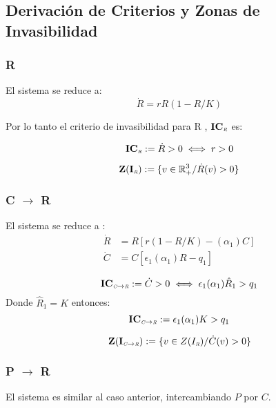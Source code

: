 


\subsection{Derivaci\'on de Criterios y Zonas de Invasibilidad}\label{subsec:CI}

\subsubsection{R}
El sistema se reduce a:
\begin{equation}
\dot{R}= rR(1-R/K)
\end{equation}

Por lo tanto el criterio de invasibilidad para R , $\mathbf{IC_{\textit{\tiny R}}}$ es:

\begin{equation}\label{eq:ICR}
\mathbf{IC_{\textit{\tiny R}}} := \dot{R} > 0 \iff r > 0
\end{equation}

\begin{equation}
\mathbf{Z(I_{\textit{\tiny R}})} := \{ v \in \mathbb{R}^3_+ / \dot{R}(v)>0 \}
\end{equation}

\subsubsection{C $\to$ R}
El sistema se reduce a :
\begin{equation}
\begin{aligned}
\dot{R} &= R\left[r(1-R/K)- (\alpha_{1}) C \right] \\
\dot{C} &= C \left[\epsilon_1 (\alpha_{1}) R  -q_1 \right]
\end{aligned}
\end{equation}


\begin{equation} \mathbf{IC_{\textit{\tiny C} \to \textit{\tiny R}}} := \dot{C} >0 \iff \epsilon_1(\alpha_1)\hat{R}_1 > q_1  \end{equation}
Donde $\hat{R}_1 = K$ entonces:
\begin{equation} \mathbf{IC_{\textit{\tiny C} \to \textit{\tiny R}}} := \epsilon_1(\alpha_1) K > q_1 \end{equation}
            
\begin{equation}
\mathbf{Z(I_{\textit{\tiny C} \to \textit{\tiny R}})} := \{v \in Z(I_{\textit{\tiny R}}) / \dot{C}(v) > 0\}
\end{equation}


\subsubsection{P $\to$ R}
El sistema es similar al caso anterior, intercambiando $P$ por $C$.


